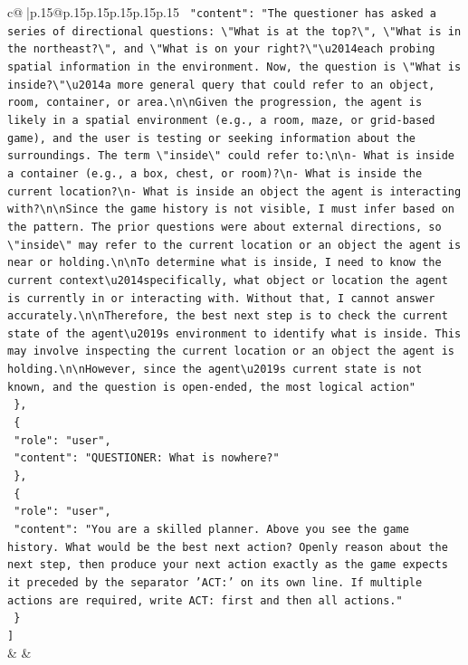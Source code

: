 \documentclass{article}
\begin{document}
{\begin{supertabular}{c@{$\;$}|p{.15\linewidth}@{}p{.15\linewidth}p{.15\linewidth}p{.15\linewidth}p{.15\linewidth}p{.15\linewidth}}
{{{\texttt{    "content": "The questioner has asked a series of directional questions: \textbackslash{}"What is at the top?\textbackslash{}", \textbackslash{}"What is in the northeast?\textbackslash{}", and \textbackslash{}"What is on your right?\textbackslash{}"\textbackslash{}u2014each probing spatial information in the environment. Now, the question is \textbackslash{}"What is inside?\textbackslash{}"\textbackslash{}u2014a more general query that could refer to an object, room, container, or area.\textbackslash{}n\textbackslash{}nGiven the progression, the agent is likely in a spatial environment (e.g., a room, maze, or grid{-}based game), and the user is testing or seeking information about the surroundings. The term \textbackslash{}"inside\textbackslash{}" could refer to:\textbackslash{}n\textbackslash{}n{-} What is inside a container (e.g., a box, chest, or room)?\textbackslash{}n{-} What is inside the current location?\textbackslash{}n{-} What is inside an object the agent is interacting with?\textbackslash{}n\textbackslash{}nSince the game history is not visible, I must infer based on the pattern. The prior questions were about external directions, so \textbackslash{}"inside\textbackslash{}" may refer to the current location or an object the agent is near or holding.\textbackslash{}n\textbackslash{}nTo determine what is inside, I need to know the current context\textbackslash{}u2014specifically, what object or location the agent is currently in or interacting with. Without that, I cannot answer accurately.\textbackslash{}n\textbackslash{}nTherefore, the best next step is to check the current state of the agent\textbackslash{}u2019s environment to identify what is inside. This may involve inspecting the current location or an object the agent is holding.\textbackslash{}n\textbackslash{}nHowever, since the agent\textbackslash{}u2019s current state is not known, and the question is open{-}ended, the most logical action"} \\
\texttt{  \},} \\
\texttt{  \{} \\
\texttt{    "role": "user",} \\
\texttt{    "content": "QUESTIONER: What is nowhere?"} \\
\texttt{  \},} \\
\texttt{  \{} \\
\texttt{    "role": "user",} \\
\texttt{    "content": "You are a skilled planner. Above you see the game history. What would be the best next action? Openly reason about the next step, then produce your next action exactly as the game expects it preceded by the separator 'ACT:' on its own line. If multiple actions are required, write ACT: first and then all actions."} \\
\texttt{  \}} \\
\texttt{{]}} \\
            }
        }
    }
    & & \\ \\


\end{supertabular}}
\end{document}
